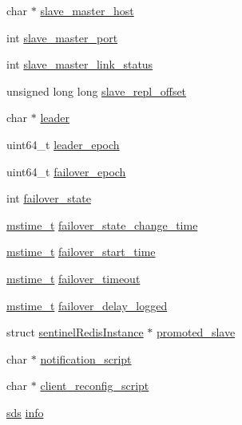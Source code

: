 \begin{DoxyCompactItemize}
char $\ast$ \hyperlink{structsentinel_redis_instance_ae2ca799b63153fe0fe2fd3ae30a0dd7c}{slave\+\_\+master\+\_\+host}
\item 
int \hyperlink{structsentinel_redis_instance_ac8b1eca10f08feae88a6d70d4b912820}{slave\+\_\+master\+\_\+port}
\item 
int \hyperlink{structsentinel_redis_instance_ac54c578b9e74dcadfc260f8239f49c6a}{slave\+\_\+master\+\_\+link\+\_\+status}
\item 
unsigned long long \hyperlink{structsentinel_redis_instance_ada383d628ea25d7100e1e9c80d885945}{slave\+\_\+repl\+\_\+offset}
\item 
char $\ast$ \hyperlink{structsentinel_redis_instance_af4c224e29ecddc6dd5ccb9157bacd31d}{leader}
\item 
uint64\+\_\+t \hyperlink{structsentinel_redis_instance_a1cedbabf9f4c16ccd7e1ed0442f38bc9}{leader\+\_\+epoch}
\item 
uint64\+\_\+t \hyperlink{structsentinel_redis_instance_aa9b7cbccacb918bf75f679a5ff1b72db}{failover\+\_\+epoch}
\item 
int \hyperlink{structsentinel_redis_instance_a7734083864ffe8265ec0ee14a13d0f46}{failover\+\_\+state}
\item 
\hyperlink{redismodule_8h_a652ae61e2475bc8957454534544968fc}{mstime\+\_\+t} \hyperlink{structsentinel_redis_instance_a9f31a45169bdf0d6c79197e49699c233}{failover\+\_\+state\+\_\+change\+\_\+time}
\item 
\hyperlink{redismodule_8h_a652ae61e2475bc8957454534544968fc}{mstime\+\_\+t} \hyperlink{structsentinel_redis_instance_a649edb20a450e2c3dd8a76e026c41cd3}{failover\+\_\+start\+\_\+time}
\item 
\hyperlink{redismodule_8h_a652ae61e2475bc8957454534544968fc}{mstime\+\_\+t} \hyperlink{structsentinel_redis_instance_a6d19d8dd2fb65314dead92142201bac7}{failover\+\_\+timeout}
\item 
\hyperlink{redismodule_8h_a652ae61e2475bc8957454534544968fc}{mstime\+\_\+t} \hyperlink{structsentinel_redis_instance_a8b2c907f18ccb5f59f4dc6b27e586a0d}{failover\+\_\+delay\+\_\+logged}
\item 
struct \hyperlink{structsentinel_redis_instance}{sentinel\+Redis\+Instance} $\ast$ \hyperlink{structsentinel_redis_instance_a33415e47bde1dad0df5d117570d9f296}{promoted\+\_\+slave}
\item 
char $\ast$ \hyperlink{structsentinel_redis_instance_aa7d5bdc4dfd1bd1432defdeab5ec44cb}{notification\+\_\+script}
\item 
char $\ast$ \hyperlink{structsentinel_redis_instance_a85d5e4c13edf78f6da253f29de50059c}{client\+\_\+reconfig\+\_\+script}
\item 
\hyperlink{sds_8h_ad69abac3df4532879db9642c95f5ef6f}{sds} \hyperlink{structsentinel_redis_instance_a3cbe9e8146d4f525bb3e89056f65a264}{info}
\end{DoxyCompactItemize}


